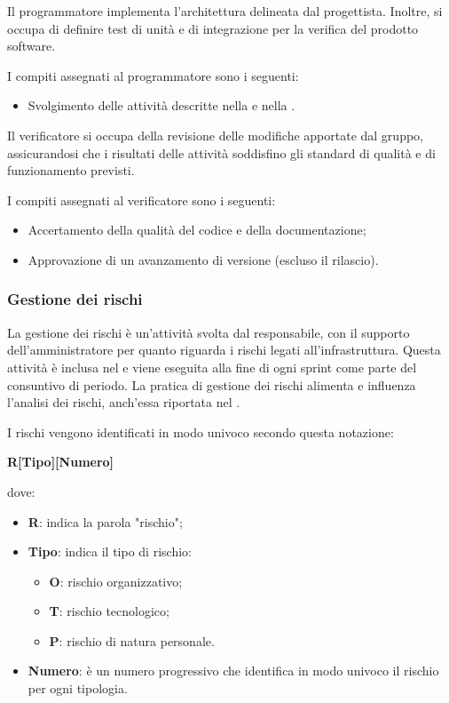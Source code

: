 \par Il programmatore implementa l'architettura delineata dal progettista. Inoltre, si occupa di definire test di unità e di integrazione per la verifica del prodotto software.
\par I compiti assegnati al programmatore sono i seguenti:
\begin{itemize}
  \item Svolgimento delle attività descritte nella  e nella .
\end{itemize}

\par Il verificatore si occupa della revisione delle modifiche apportate dal gruppo, assicurandosi che i risultati delle attività soddisfino gli standard di qualità e di funzionamento previsti.
\par I compiti assegnati al verificatore sono i seguenti:
\begin{itemize}
  \item Accertamento della qualità del codice e della documentazione;
  \item Approvazione di un avanzamento di versione (escluso il rilascio).
\end{itemize}

\subsubsection{Gestione dei rischi}
\par La gestione dei rischi è un’attività svolta dal responsabile, con il supporto dell’amministratore per quanto riguarda i rischi legati all’infrastruttura. Questa attività è inclusa nel \PianoDiProgetto e viene eseguita alla fine di ogni sprint come parte del consuntivo di periodo. La pratica di gestione dei rischi alimenta e influenza l’analisi dei rischi, anch’essa riportata nel \PianoDiProgetto.

\par I rischi vengono identificati in modo univoco secondo questa notazione: 
\par \quad \textbf{R[Tipo][Numero]}
\par dove: 
\begin{itemize}
  \item \textbf{R}: indica la parola "rischio";
  \item \textbf{Tipo}: indica il tipo di rischio: 
  \begin{itemize}
    \item \textbf{O}: rischio organizzativo; 
    \item \textbf{T}: rischio tecnologico;
    \item \textbf{P}: rischio di natura personale.
  \end{itemize}
  \item \textbf{Numero}: è un numero progressivo che identifica in modo univoco il rischio per ogni tipologia.
\end{itemize}

